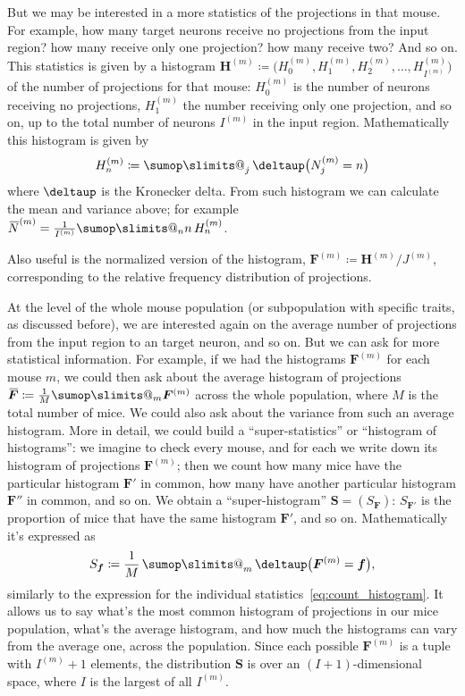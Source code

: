 \documentclass[\ifafour a4paper,12pt,\else a5paper,10pt,\fi%
onecolumn,oneside,article,%
british%
]{memoir}
\makeatletter
\theoremstyle{remark}
\theoremstyle{innote}
\def\sum{\DOTSI\sumop\slimits@}
\newcommand*{\delt}{\deltaup}%
\newcommand*{\defd}{\coloneqq}
\renewcommand*{\|}[1][]{\nonscript\,#1\vert\nonscript\;\mathopen{}}
\newcommand*{\tsum}{\mathop{\textstyle\sum}\nolimits}
\newcommand*{\widebar}[1]{{\mkern1.5mu\skew{2}\overline{\mkern-1.5mu#1\mkern-1.5mu}\mkern 1.5mu}}
\newcommand*{\yNa}{\widebar{N}}
\newcommand*{\yF}{\bm{F}}
\newcommand*{\yFm}[1][m]{\yF^{(#1)}}
\newcommand*{\yH}{\bm{H}}
\newcommand*{\yHHm}[1][m]{H^{(#1)}}
\newcommand*{\yHm}[1][m]{\yH^{(#1)}}
\newcommand*{\yIm}[1][m]{I^{(#1)}}
\newcommand*{\yJm}[1][m]{J^{(#1)}}
\newcommand*{\yNm}[1][m]{N^{(#1)}}
\newcommand*{\yNma}[1][m]{\yNa^{(#1)}}
\newcommand*{\yFa}{\widebar{\yF}}
\newcommand*{\ySS}{S}
\newcommand*{\yS}{\bm{\ySS}}
\makeatother
\begin{document}
But we may be interested in a more statistics of the projections in that
mouse. For example, how many target neurons receive no projections from the
input region? how many receive only one projection? how many receive two?
And so on. This statistics is given by a histogram
$\yHm\defd \bigl(\yHHm_{0},\yHHm_{1}, \yHHm_{2},\dotsc, \yHHm_{\yIm}\bigr)$
of the number of projections for that mouse: $\yHHm_{0}$ is the number of
neurons receiving no projections, $\yHHm_{1}$ the number receiving only one
projection, and so on, up to the total number of neurons $\yIm$ in the
input region. Mathematically this histogram is given by
\begin{equation}
   \label{eq:count_histogram}
    \yHHm_{n} \defd \tsum_{j} \delt\bigl(\yNm_{j} = n\bigr)
\end{equation}
where $\delt$ is the Kronecker delta. From such histogram we can calculate
the mean and variance above; for example
$\yNma = \frac{1}{\yIm}\sum_{n}n\,\yHHm_{n}$.

Also useful is the normalized version of the histogram,
$\yFm \defd \yHm/\yJm$, corresponding to the relative frequency
distribution of projections.

\medskip

At the level of the whole mouse population (or subpopulation with specific
traits, as discussed before), we are interested again on the average number
of projections from the input region to an target neuron, and so on. But we
can ask for more statistical information. For example, if we had the
histograms $\yFm$ for each mouse $m$, we could then ask about the average
histogram of projections $\yFa \defd \frac{1}{M}\sum_{m} \yFm$ across the
whole population, where $M$ is the total number of mice. We could also ask
about the variance from such an average histogram. More in detail, we could
build a \enquote{super-statistics} or \enquote{histogram of histograms}: we
imagine to check every mouse, and for each we write down its histogram of
projections $\yFm$; then we count how many mice have the particular
histogram $\yF'$ in common, how many have another particular histogram
$\yF''$ in common, and so on. We obtain a \enquote{super-histogram}
$\yS=(\ySS_{\yF})$: $\ySS_{\yF'}$ is the proportion of mice that have the
same histogram $\yF'$, and so on. Mathematically it's expressed as
  \begin{equation}
    \label{eq:count_superhistogram}
    \ySS_{\bm{f}} \defd \frac{1}{M} \tsum_{m} \delt\bigl(\yFm = \bm{f}\bigr),
\end{equation}
similarly to the expression for the individual
statistics~\eqref{eq:count_histogram}. It allows us to say what's the most
common histogram of projections in our mice population, what's the average
histogram, and how much the histograms can vary from the average one,
across the population. Since each possible $\yFm$ is a tuple with $\yIm+1$
elements, the distribution $\yS$ is over an $(I+1)$-dimensional space,
where $I$ is the largest of all $\yIm$.
\end{document}
